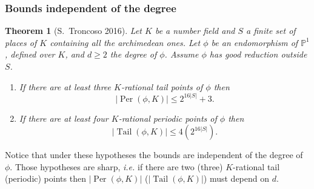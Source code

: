\documentclass{beamer}
\def\PP{{\mathbb P}}
\def\QQ{{\mathbb Q}}
\DeclareMathOperator{\Tail}{Tail}
\DeclareMathOperator{\Per}{Per}
\theoremstyle{thmstyle}
\theoremstyle{thmstyle}
\newtheorem*{mythm}{Theorem}
\theoremstyle{mystyle}
\theoremstyle{qstnstyle}
\begin{document}
%
%





\begin{frame}
\frametitle{Bounds independent of the degree}
\begin{mythm}[S.\ Troncoso 2016]
Let $K$ be a number field and $S$ a finite set of places of $K$ containing all the archimedean ones. Let $\phi $ be an endomorphism of $\PP^1$, defined over $K$, and $d \geq 2$ the degree of $\phi$. Assume $\phi$ has  good reduction outside $S$.
\begin{enumerate}

\item [(a)] 
If there are at least three $K$-rational tail points of $\phi$ then
$$|\Per(\phi,K)| \leq 2^{16|S|}+3. $$

\item [(b)]
If there are at least four $K$-rational periodic points of $\phi$ then
$$|\Tail(\phi,K)| \leq 4(2^{16|S|}).$$
\end{enumerate}
\end{mythm}
\pause
Notice that under these hypotheses the bounds are independent of the degree of $\phi$. Those hypotheses are sharp, \emph{i.e.} if there are two (three) $K$-rational tail (periodic) points then $|\Per(\phi,K)|$ ($|\Tail(\phi,K)|$) must depend on $d$. 
\end{frame}
\end{document}
